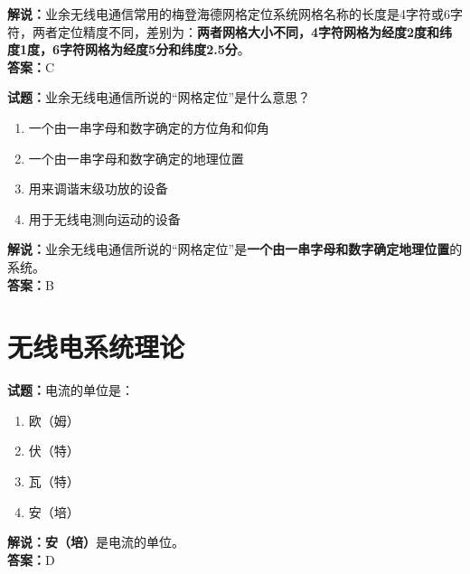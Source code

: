 \documentclass{ctexbook}
\begin{document}
\noindent\textbf{解说：}业余无线电通信常用的梅登海德网格定位系统网格名称的长度是4字符或6字符，两者定位精度不同，差别为：\textbf{两者网格大小不同，4字符网格为经度2度和纬度1度，6字符网格为经度5分和纬度2.5分}。\\\noindent\textbf{答案：}C

\bigskip


\noindent\textbf{试题：}业余无线电通信所说的“网格定位”是什么意思？

\begin{enumerate}[leftmargin=3em]
	\item 一个由一串字母和数字确定的方位角和仰角
	\item 一个由一串字母和数字确定的地理位置 %
	\item 用来调谐末级功放的设备
	\item 用于无线电测向运动的设备
\end{enumerate}

\noindent\textbf{解说：}业余无线电通信所说的“网格定位”是\textbf{一个由一串字母和数字确定地理位置}的系统。\\\noindent\textbf{答案：}B





















\chapter{无线电系统理论}

\newpage


\noindent\textbf{试题：}电流的单位是：

\begin{enumerate}[leftmargin=3em]
	\item 欧（姆）
	\item 伏（特）
	\item 瓦（特）
	\item 安（培）
\end{enumerate}

\noindent\textbf{解说：}\textbf{安（培）}是电流的单位。\cite[137-138]{si}\\
\noindent\textbf{答案：}D
\end{document}

